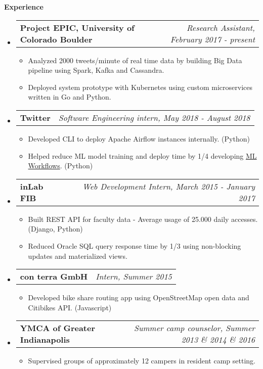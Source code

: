 \documentclass[letterpaper,10pt]{article}
\makeatletter
\newcommand{\resitem}[1]{\item #1 \vspace{-2pt}}
\newcommand{\resheading}[1]{{\large \colorbox{mygrey}{\begin{minipage}{\textwidth}{\textbf{#1 \vphantom{p\^{E}}}}\end{minipage}}}}
\newcommand{\ressubheading}[4]{
\begin{tabular*}{7.0in}{l@{\extracolsep{\fill}}r}
		\textbf{#1} & \textit{#4} \\
\end{tabular*}\vspace{-6pt}}
\makeatother
\begin{document}
\resheading{Experience}
	\begin{itemize}
		\item
			\ressubheading{Project EPIC, University of Colorado Boulder}{Boulder, CO}{Research Assistant}{Research Assistant, February 2017 - present}
			\begin{itemize}
				\resitem{Analyzed 2000 tweets/minute of real time data by building Big Data pipeline using Spark, Kafka and Cassandra.} 
				\resitem{Deployed system prototype with Kubernetes using custom microservices written in Go and Python.}
			\end{itemize}
			\item
			\ressubheading{Twitter}{Boulder, CO}{Software Engineering intern}{Software Engineering intern, May 2018 - August 2018}
			\begin{itemize}
				\resitem{Developed CLI to deploy Apache Airflow instances internally. (Python)}
				\resitem{Helped reduce ML model training and deploy time by 1/4 developing \href{https://blog.twitter.com/engineering/en_us/topics/insights/2018/ml-workflows.html}{ML Workflows}. (Python)}
			\end{itemize}
		\item
			\ressubheading{inLab FIB}{Barcelona, Spain}{Web Development Intern}{Web Development Intern, March 2015 - January 2017}
			\begin{itemize}
				\resitem{Built REST API for faculty data - Average usage of 25.000 daily accesses. (Django, Python)}
				\resitem{Reduced Oracle SQL query response time by 1/3 using non-blocking updates and materialized views.}
			\end{itemize}

		\item
			\ressubheading{con terra GmbH}{Münster, Germany}{Intern}{Intern, Summer 2015}
			\begin{itemize}
				\resitem{Developed bike share routing app using OpenStreetMap open data and Citibikes API. (Javascript)}
			\end{itemize}
		\item
			\ressubheading{YMCA of Greater Indianapolis}{St. Paul, IN}{Summer camp counselor}{Summer camp counselor, Summer 2013 \& 2014 \& 2016}
			\begin{itemize}
				\resitem{Supervised groups of approximately 12 campers in resident camp setting.}
			\end{itemize}
	\end{itemize}
\end{document}
